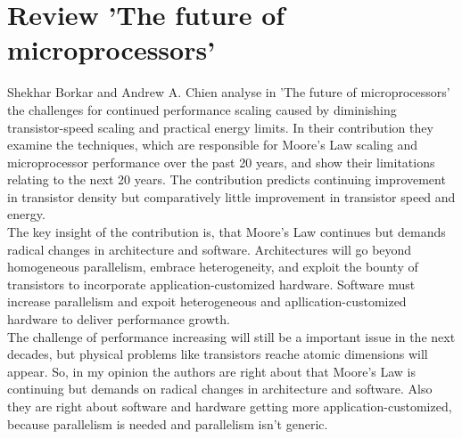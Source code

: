 \documentclass{article}
\newcommand{\enterProblemHeader}[1]{
}
\newcommand{\exitProblemHeader}[1]{
}
\newcounter{homeworkProblemCounter} %
\newcommand{\homeworkProblemName}{}
\newenvironment{homeworkProblem}[1][Problem \arabic{homeworkProblemCounter}]{ %
\stepcounter{homeworkProblemCounter} %
\renewcommand{\homeworkProblemName}{#1} %
\section{\homeworkProblemName} %
}{
}
\begin{document}
\begin{homeworkProblem}[Review 'The future of microprocessors']
Shekhar Borkar and Andrew A. Chien analyse in 'The future of microprocessors' the
challenges for continued performance scaling caused by diminishing transistor-speed scaling
and practical energy limits. In their contribution they examine the techniques, which are
responsible for Moore's Law scaling and microprocessor performance over the past 20 years,
and show their limitations relating to the next 20 years. The contribution predicts
continuing improvement in transistor density but comparatively little improvement in transistor
speed and energy.
\\
The key insight of the contribution is, that Moore's Law continues but demands radical 
changes in architecture and software. Architectures will go beyond homogeneous parallelism,
embrace heterogeneity, and exploit the bounty of transistors to incorporate 
application-customized hardware. Software must increase parallelism and expoit heterogeneous
and apllication-customized hardware to deliver performance growth.
\\
The challenge of performance increasing will still be a important issue in the next decades,
but physical problems like transistors reache atomic dimensions will appear.
So, in my opinion the authors are right about that Moore's Law is continuing but demands on
radical changes in architecture and software. Also they are right about software and hardware
getting more application-customized, because parallelism is needed and parallelism isn't 
generic.
\end{homeworkProblem}
\clearpage
\end{document}
